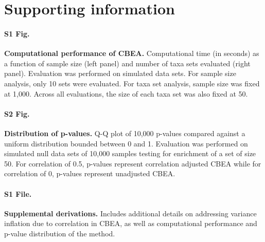 \documentclass[10pt,letterpaper]{article}
\begin{document}
\section*{Supporting information}

\paragraph*{S1 Fig.}
\label{S1_Fig}
{\bf Computational performance of CBEA.} Computational time (in seconds) as a function of sample size (left panel) and number of taxa sets evaluated (right panel). Evaluation was performed on simulated data sets. For sample size analysis, only 10 sets were evaluated. For taxa set analysis, sample size was fixed at 1,000. Across all evaluations, the size of each taxa set was also fixed at 50. 

\paragraph*{S2 Fig.}
\label{S2_Fig}
{\bf Distribution of p-values.} Q-Q plot of 10,000 p-values compared against a uniform distribution bounded between 0 and 1. Evaluation was performed on simulated null data sets of 10,000 samples testing for enrichment of a set of size 50. For correlation of 0.5, p-values represent correlation adjusted CBEA while for correlation of 0, p-values represent unadjusted CBEA. 

\paragraph*{S1 File.}
\label{S1_File}
{\bf Supplemental derivations.} Includes additional details on addressing variance inflation due to correlation in CBEA, as well as computational performance and p-value distribution of the method.   
\end{document}
